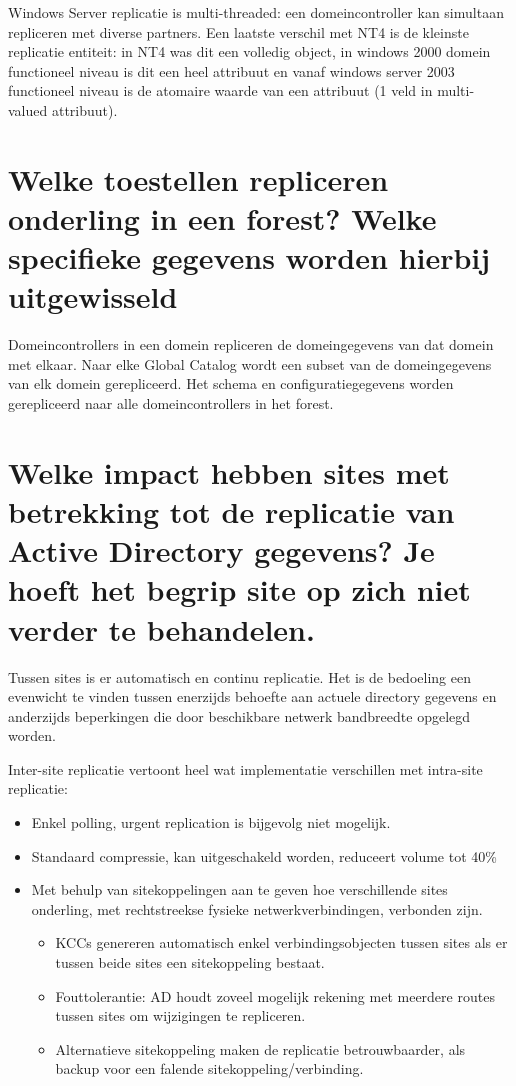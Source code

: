 Windows Server replicatie is multi-threaded: een domeincontroller kan simultaan
repliceren met diverse partners. Een laatste verschil met NT4 is de kleinste
replicatie entiteit: in NT4 was dit een volledig object, in windows 2000
domein functioneel niveau is dit een heel attribuut en vanaf windows server 2003
functioneel niveau is de atomaire waarde van een attribuut (1 veld in
multi-valued attribuut).

\section{Welke toestellen repliceren onderling in een forest? Welke
specifieke gegevens worden hierbij uitgewisseld}

Domeincontrollers in een domein repliceren de domeingegevens van dat domein met
elkaar. Naar elke Global Catalog wordt een subset van de domeingegevens van elk
domein gerepliceerd. Het schema en configuratiegegevens worden gerepliceerd naar
alle domeincontrollers in het forest.

\section{Welke impact hebben sites met betrekking tot de replicatie van Active
Directory gegevens? Je hoeft het begrip site op zich niet verder te behandelen.}

Tussen sites is er automatisch en continu replicatie. Het is de bedoeling een
evenwicht te vinden tussen enerzijds behoefte aan actuele directory gegevens en
anderzijds beperkingen die door beschikbare netwerk bandbreedte opgelegd worden.

Inter-site replicatie vertoont heel wat implementatie verschillen met intra-site
replicatie:
\begin{itemize}
	\item Enkel polling, urgent replication is bijgevolg niet mogelijk.
	\item Standaard compressie, kan uitgeschakeld worden, reduceert volume
		tot 40\%
	\item Met behulp van sitekoppelingen aan te geven hoe verschillende
		sites onderling, met rechtstreekse fysieke netwerkverbindingen,
		verbonden zijn.
		\begin{itemize}
			\item KCCs genereren automatisch enkel
				verbindingsobjecten tussen sites als er tussen
				beide sites een sitekoppeling bestaat.
			\item Fouttolerantie: AD houdt zoveel mogelijk rekening
				met meerdere routes tussen sites om wijzigingen
				te repliceren.
			\item Alternatieve sitekoppeling maken de replicatie
				betrouwbaarder, als backup voor een falende
				sitekoppeling/verbinding.
		\end{itemize}
\end{itemize}
